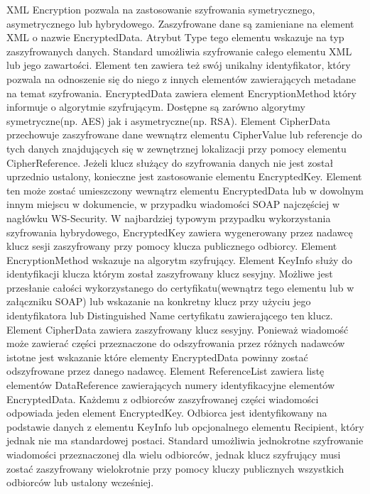 XML Encryption pozwala na zastosowanie szyfrowania symetrycznego, asymetrycznego lub hybrydowego. 
Zaszyfrowane dane są zamieniane na element XML o nazwie EncryptedData. Atrybut Type tego elementu wskazuje na typ zaszyfrowanych danych. Standard umożliwia szyfrowanie całego elementu XML lub jego zawartości. Element ten zawiera też swój unikalny identyfikator, który pozwala na odnoszenie się do niego z innych elementów zawierających metadane na temat szyfrowania. EncryptedData zawiera element EncryptionMethod który informuje o algorytmie szyfrującym. Dostępne są zarówno algorytmy symetryczne(np. AES) jak i asymetryczne(np. RSA). Element CipherData przechowuje zaszyfrowane dane wewnątrz elementu CipherValue lub referencje do tych danych znajdujących się w zewnętrznej lokalizacji przy pomocy elementu CipherReference.
Jeżeli klucz służący do szyfrowania danych nie jest został uprzednio ustalony, konieczne jest zastosowanie elementu EncryptedKey. Element ten może zostać umieszczony wewnątrz elementu EncryptedData lub w dowolnym innym miejscu w dokumencie, w przypadku wiadomości SOAP najczęściej w nagłówku WS-Security.
W najbardziej typowym przypadku wykorzystania szyfrowania hybrydowego, EncryptedKey zawiera wygenerowany przez nadawcę klucz sesji zaszyfrowany przy pomocy klucza publicznego odbiorcy. Element EncryptionMethod wskazuje na algorytm szyfrujący. Element KeyInfo służy do identyfikacji klucza którym został zaszyfrowany klucz sesyjny. Możliwe jest przesłanie całości wykorzystanego do certyfikatu(wewnątrz tego elementu lub w załączniku SOAP) lub wskazanie na konkretny klucz przy użyciu jego identyfikatora lub Distinguished Name certyfikatu zawierającego ten klucz. 
Element CipherData zawiera zaszyfrowany klucz sesyjny. 
Ponieważ wiadomość może zawierać części przeznaczone do odszyfrowania przez różnych nadawców istotne jest wskazanie które elementy EncryptedData powinny zostać odszyfrowane przez danego nadawcę. Element ReferenceList zawiera listę elementów DataReference zawierających numery identyfikacyjne elementów EncryptedData. 
Każdemu z odbiorców zaszyfrowanej części wiadomości odpowiada jeden element EncryptedKey. Odbiorca jest identyfikowany na podstawie danych z elementu KeyInfo lub opcjonalnego elementu Recipient, który jednak nie ma standardowej postaci. \cite{Eastlake:02:XES} 
Standard umożliwia jednokrotne szyfrowanie wiadomości przeznaczonej dla wielu odbiorców, jednak klucz szyfrujący musi zostać zaszyfrowany wielokrotnie przy pomocy kluczy publicznych wszystkich odbiorców lub ustalony wcześniej. 



